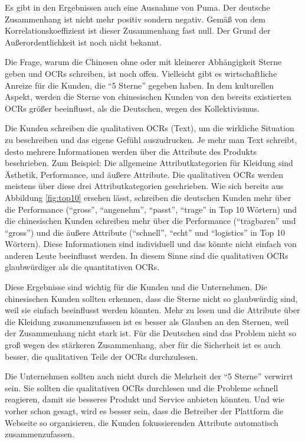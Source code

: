 Es gibt in den Ergebnissen auch eine Ausnahme von Puma. Der deutsche Zusammenhang ist nicht mehr positiv sondern negativ. Gemäß von dem Korrelationskoeffizient  ist dieser Zusammenhang fast null. Der Grund der Außerordentlichkeit ist noch nicht bekannt.

Die Frage, warum die Chinesen ohne oder mit kleinerer Abhängigkeit Sterne geben und \ac{OCRs} schreiben, ist noch offen. Vielleicht gibt es wirtschaftliche Anreize für die Kunden, die ``5 Sterne'' gegeben haben. In dem kulturellen Aspekt, werden die Sterne von chinesischen Kunden von den bereits existierten \ac{OCRs} größer beeinflusst, als die Deutschen, wegen des Kollektivismus. 

Die Kunden schreiben die qualitativen \ac{OCRs} (Text), um die wirkliche Situation zu beschreiben und das eigene Gefühl auszudrucken. Je mehr man Text schreibt, desto mehrere Informationen werden über die Attribute des Produkts beschrieben. Zum Beispiel: Die allgemeine Attributkategorien für Kleidung sind Ästhetik, Performance, und äußere Attribute. Die qualitativen \ac{OCRs} werden meistens über diese drei Attributkategorien geschrieben. Wie sich bereits aus Abbildung \ref{fig:top10} ersehen lässt, schreiben die deutschen Kunden mehr über die Performance (``gross'', ``angenehm'', ``passt'', ``trage'' in Top 10 Wörtern) und die chinesischen Kunden schreiben mehr über die Performance (``tragbaren'' und ``gross'') und die äußere Attribute (``schnell'', ``echt'' und ``logistics'' in Top 10 Wörtern). Diese Informationen sind individuell und das könnte nicht einfach von anderen Leute beeinflusst werden. In diesem Sinne sind die qualitativen \ac{OCRs} glaubwürdiger als die quantitativen \ac{OCRs}. 

Diese Ergebnisse sind wichtig für die Kunden und die Unternehmen. Die chinesischen Kunden sollten erkennen, dass die Sterne nicht so glaubwürdig sind, weil sie einfach beeinflusst werden könnten. Mehr zu lesen und die Attribute über die Kleidung zusammenzufassen ist es besser als Glauben an den Sternen, weil der Zusammenhang nicht stark ist. Für die Deutschen sind das Problem nicht so groß wegen des stärkeren Zusammenhang, aber für die Sicherheit ist es auch besser, die qualitativen Teile der \ac{OCRs} durchzulesen.

Die Unternehmen sollten auch nicht durch die Mehrheit der ``5 Sterne'' verwirrt sein. Sie sollten die qualitativen \ac{OCRs} durchlesen und die Probleme schnell reagieren, damit sie besseres Produkt und Service anbieten könnten. Und wie vorher schon gesagt, wird es besser sein, dass die Betreiber der Plattform die Webseite so organisieren, die Kunden fokussierenden Attribute automatisch zusammenzufassen.
